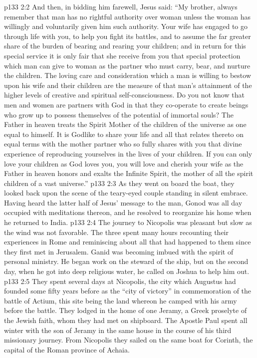 \vs p133 2:2 And then, in bidding him farewell, Jesus said: \textcolor{ubdarkred}{“My brother, always remember that man has no rightful authority over woman unless the woman has willingly and voluntarily given him such authority. Your wife has engaged to go through life with you, to help you fight its battles, and to assume the far greater share of the burden of bearing and rearing your children; and in return for this special service it is only fair that she receive from you that special protection which man can give to woman as the partner who must carry, bear, and nurture the children. The loving care and consideration which a man is willing to bestow upon his wife and their children are the measure of that man’s attainment of the higher levels of creative and spiritual self\hyp{}consciousness. Do you not know that men and women are partners with God in that they co\hyp{}operate to create beings who grow up to possess themselves of the potential of immortal souls? The Father in heaven treats the Spirit Mother of the children of the universe as one equal to himself. It is Godlike to share your life and all that relates thereto on equal terms with the mother partner who so fully shares with you that divine experience of reproducing yourselves in the lives of your children. If you can only love your children as God loves you, you will love and cherish your wife as the Father in heaven honors and exalts the Infinite Spirit, the mother of all the spirit children of a vast universe.”}\plusone
\vs p133 2:3 As they went on board the boat, they looked back upon the scene of the teary\hyp{}eyed couple standing in silent embrace. Having heard the latter half of Jesus’ message to the man, Gonod was all day occupied with meditations thereon, and he resolved to reorganize his home when he returned to India.
\vs p133 2:4 The journey to Nicopolis was pleasant but slow as the wind was not favorable. The three spent many hours recounting their experiences in Rome and reminiscing about all that had happened to them since they first met in Jerusalem. Ganid was becoming imbued with the spirit of personal ministry. He began work on the steward of the ship, but on the second day, when he got into deep religious water, he called on Joshua to help him out.
\vs p133 2:5 They spent several days at Nicopolis, the city which Augustus had founded some fifty years before as the “city of victory” in commemoration of the battle of Actium, this site being the land whereon he camped with his army before the battle. They lodged in the home of one Jeramy, a Greek proselyte of the Jewish faith, whom they had met on shipboard. The Apostle Paul spent all winter with the son of Jeramy in the same house in the course of his third missionary journey. From Nicopolis they sailed on the same boat for Corinth, the capital of the Roman province of Achaia.

